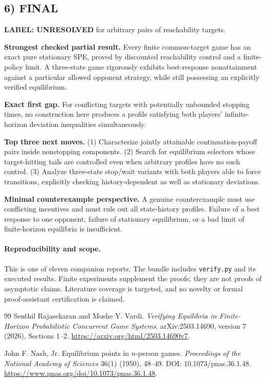 \documentclass[11pt,a4paper]{article}
\theoremstyle{definition}
\theoremstyle{remark}
\begin{document}
\subsection*{6) FINAL}
\textbf{LABEL: UNRESOLVED} for arbitrary pairs of reachability targets.

\textbf{Strongest checked partial result.} Every finite common-target game has an exact pure stationary SPE, proved by discounted reachability control and a finite-policy limit. A three-state game rigorously exhibits best-response nonattainment against a particular allowed opponent strategy, while still possessing an explicitly verified equilibrium.

\textbf{Exact first gap.} For conflicting targets with potentially unbounded stopping times, no construction here produces a profile satisfying both players' infinite-horizon deviation inequalities simultaneously.

\textbf{Top three next moves.} (1) Characterize jointly attainable continuation-payoff pairs inside nonstopping components. (2) Search for equilibrium selectors whose target-hitting tails are controlled even when arbitrary profiles have no such control. (3) Analyze three-state stop/wait variants with both players able to force transitions, explicitly checking history-dependent as well as stationary deviations.

\textbf{Minimal counterexample perspective.} A genuine counterexample must use conflicting incentives and must rule out all state-history profiles. Failure of a best response to one opponent, failure of stationary equilibrium, or a bad limit of finite-horizon equilibria is insufficient.

\paragraph{Reproducibility and scope.} This is one of eleven companion reports. The bundle includes \texttt{verify.py} and its executed results. Finite experiments supplement the proofs; they are not proofs of asymptotic claims. Literature coverage is targeted, and no novelty or formal proof-assistant certification is claimed.

\begin{thebibliography}{99}
\small
{}
Senthil Rajasekaran and Moshe Y. Vardi.
\emph{Verifying Equilibria in Finite-Horizon Probabilistic Concurrent Game Systems}.
arXiv:2503.14690, version 7 (2026), Sections 1--2.
\url{https://arxiv.org/html/2503.14690v7}.

John F. Nash, Jr. Equilibrium points in $n$-person games.
\emph{Proceedings of the National Academy of Sciences} 36(1) (1950), 48--49.
DOI: 10.1073/pnas.36.1.48.
\url{https://www.pnas.org/doi/10.1073/pnas.36.1.48}.

\end{thebibliography}
\end{document}
